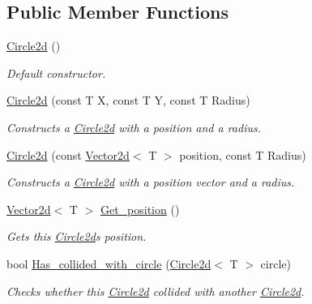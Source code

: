 \subsection*{Public Member Functions}
\begin{DoxyCompactItemize}
\item 
\hyperlink{classjetfuel_1_1draw_1_1Circle2d_a265ed4234046e3a5fd669be4f39833bf}{Circle2d} ()
\begin{DoxyCompactList}\small\item\em Default constructor. \end{DoxyCompactList}\item 
\hyperlink{classjetfuel_1_1draw_1_1Circle2d_a46ba7b221cf32824a92014a856964e15}{Circle2d} (const T X, const T Y, const T Radius)
\begin{DoxyCompactList}\small\item\em Constructs a \hyperlink{classjetfuel_1_1draw_1_1Circle2d}{Circle2d} with a position and a radius. \end{DoxyCompactList}\item 
\hyperlink{classjetfuel_1_1draw_1_1Circle2d_abf30145c0e5f6602b735cebbff5ff12e}{Circle2d} (const \hyperlink{classjetfuel_1_1draw_1_1Vector2d}{Vector2d}$<$ T $>$ position, const T Radius)
\begin{DoxyCompactList}\small\item\em Constructs a \hyperlink{classjetfuel_1_1draw_1_1Circle2d}{Circle2d} with a position vector and a radius. \end{DoxyCompactList}\item 
\hyperlink{classjetfuel_1_1draw_1_1Vector2d}{Vector2d}$<$ T $>$ \hyperlink{classjetfuel_1_1draw_1_1Circle2d_ac29db892cec9356a9462fb1b78015a4a}{Get\+\_\+position} ()
\begin{DoxyCompactList}\small\item\em Gets this \hyperlink{classjetfuel_1_1draw_1_1Circle2d}{Circle2d}\textquotesingle{}s position. \end{DoxyCompactList}\item 
bool \hyperlink{classjetfuel_1_1draw_1_1Circle2d_aa34855d4f859792e7343608571af5501}{Has\+\_\+collided\+\_\+with\+\_\+circle} (\hyperlink{classjetfuel_1_1draw_1_1Circle2d}{Circle2d}$<$ T $>$ circle)
\begin{DoxyCompactList}\small\item\em Checks whether this \hyperlink{classjetfuel_1_1draw_1_1Circle2d}{Circle2d} collided with another \hyperlink{classjetfuel_1_1draw_1_1Circle2d}{Circle2d}. \end{DoxyCompactList}\item 

\end{DoxyCompactItemize}
